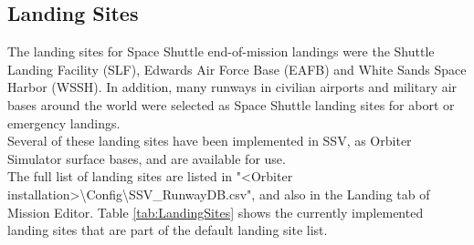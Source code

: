 \documentclass[Space_Shuttle_Vessel_Manual.tex]{subfiles}
\begin{document}
\begin{multicols*}{2}
\subsection{Landing Sites}
\label{sec:landing-sites}
\noindent

The landing sites for Space Shuttle end-of-mission landings were the Shuttle Landing Facility (SLF), Edwards Air Force Base (EAFB) and White Sands Space Harbor (WSSH). In addition, many runways in civilian airports and military air bases around the world were selected as Space Shuttle landing sites for abort or emergency landings.
\\
Several of these landing sites have been implemented in SSV, as Orbiter Simulator surface bases, and are available for use.
\\
The full list of landing sites are listed in "<Orbiter installation>\textbackslash Config\textbackslash SSV\_RunwayDB.csv", and also in the Landing tab of Mission Editor.
Table \ref{tab:LandingSites} shows the currently implemented landing sites that are part of the default landing site list.


\end{multicols*}
\end{document}
